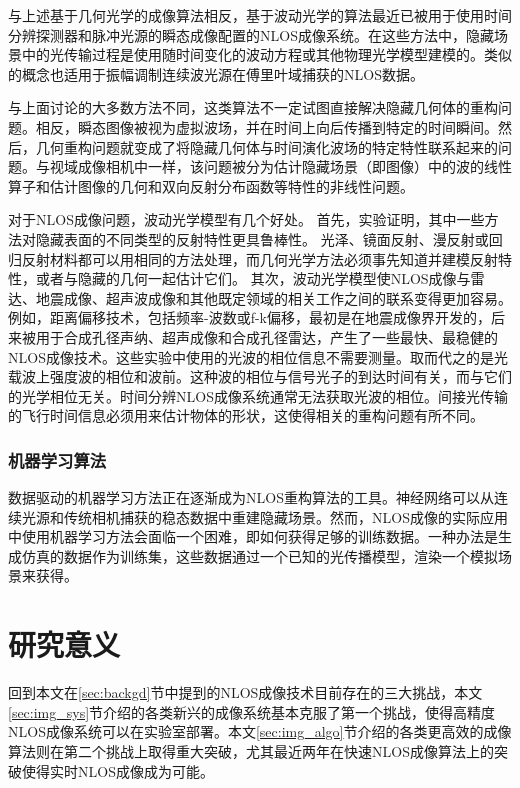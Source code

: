 \documentclass[master]{shtthesis}             %
\begin{document}
与上述基于几何光学的成像算法相反，基于波动光学的算法最近已被用于使用时间分辨探测器和脉冲光源的瞬态成像配置的NLOS成像系统\citep{Liu2019,DavidB.Lindell2019,Teichman2019,Elten2019,Dove2019}。在这些方法中，隐藏场景中的光传输过程是使用随时间变化的波动方程或其他物理光学模型建模的。类似的概念也适用于振幅调制连续波光源在傅里叶域捕获的NLOS数据\citep{kadambi2013coded}。

与上面讨论的大多数方法不同，这类算法不一定试图直接解决隐藏几何体的重构问题。相反，瞬态图像被视为虚拟波场，并在时间上向后传播到特定的时间瞬间。然后，几何重构问题就变成了将隐藏几何体与时间演化波场的特定特性联系起来的问题。与视域成像相机中一样，该问题被分为估计隐藏场景（即图像）中的波的线性算子和估计图像的几何和双向反射分布函数等特性的非线性问题。

对于NLOS成像问题，波动光学模型有几个好处。
首先，实验证明，其中一些方法对隐藏表面的不同类型的反射特性更具鲁棒性。
光泽、镜面反射、漫反射或回归反射材料都可以用相同的方法处理，而几何光学方法必须事先知道并建模反射特性，或者与隐藏的几何一起估计它们。
其次，波动光学模型使NLOS成像与雷达、地震成像、超声波成像和其他既定领域的相关工作之间的联系变得更加容易。例如，距离偏移技术，包括频率-波数或f-k偏移，最初是在地震成像界开发的\citep{stolt1978migration}，后来被用于合成孔径声纳\citep{callow2003signal,sheriff1992synthetic}、超声成像\citep{sheriff1992synthetic}和合成孔径雷达\citep{sheriff1992synthetic}，产生了一些最快、最稳健的NLOS成像技术\citep{DavidB.Lindell2019}。这些实验中使用的光波的相位信息不需要测量。取而代之的是光载波上强度波的相位和波前。这种波的相位与信号光子的到达时间有关，而与它们的光学相位无关。时间分辨NLOS成像系统通常无法获取光波的相位。间接光传输的飞行时间信息必须用来估计物体的形状，这使得相关的重构问题有所不同。

\subsubsection{机器学习算法}

数据驱动的机器学习方法正在逐渐成为NLOS重构算法的工具。神经网络可以从连续光源和传统相机捕获的稳态数据中重建隐藏场景\citep{tancik2018data,chen2019steady}。然而，NLOS成像的实际应用中使用机器学习方法会面临一个困难，即如何获得足够的训练数据。一种办法是生成仿真的数据作为训练集，这些数据通过一个已知的光传播模型，渲染一个模拟场景来获得。

\section{研究意义}

回到本文在\ref{sec:backgd}节中提到的NLOS成像技术目前存在的三大挑战，本文\ref{sec:img_sys}节介绍的各类新兴的成像系统基本克服了第一个挑战，使得高精度NLOS成像系统可以在实验室部署。本文\ref{sec:img_algo}节介绍的各类更高效的成像算法则在第二个挑战上取得重大突破，尤其最近两年在快速NLOS成像算法上的突破使得实时NLOS成像成为可能。
\end{document}
